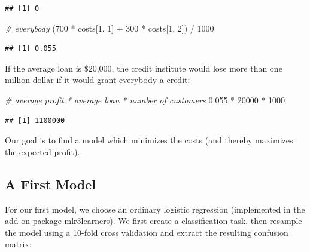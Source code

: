 \documentclass[
]{scrbook}
\newenvironment{Shaded}{\begin{snugshade}}{\end{snugshade}}
\newcommand{\CommentTok}[1]{\textcolor[rgb]{0.56,0.35,0.01}{\textit{#1}}}
\newcommand{\DecValTok}[1]{\textcolor[rgb]{0.00,0.00,0.81}{#1}}
\newcommand{\FloatTok}[1]{\textcolor[rgb]{0.00,0.00,0.81}{#1}}
\newcommand{\FunctionTok}[1]{\textcolor[rgb]{0.00,0.00,0.00}{#1}}
\newcommand{\NormalTok}[1]{#1}
\newcommand{\OtherTok}[1]{\textcolor[rgb]{0.56,0.35,0.01}{#1}}
\newcommand{\SpecialCharTok}[1]{\textcolor[rgb]{0.00,0.00,0.00}{#1}}
\newcommand{\StringTok}[1]{\textcolor[rgb]{0.31,0.60,0.02}{#1}}
\renewenvironment{Shaded} {\begin{snugshade}\small} {\end{snugshade}}
\begin{document}
\begin{verbatim}
## [1] 0
\end{verbatim}

\begin{Shaded}
\begin{Highlighting}[]
\CommentTok{\# everybody}
\NormalTok{(}\DecValTok{700} \SpecialCharTok{*}\NormalTok{ costs[}\DecValTok{1}\NormalTok{, }\DecValTok{1}\NormalTok{] }\SpecialCharTok{+} \DecValTok{300} \SpecialCharTok{*}\NormalTok{ costs[}\DecValTok{1}\NormalTok{, }\DecValTok{2}\NormalTok{]) }\SpecialCharTok{/} \DecValTok{1000}
\end{Highlighting}
\end{Shaded}

\begin{verbatim}
## [1] 0.055
\end{verbatim}

If the average loan is \$20,000, the credit institute would lose more than one million dollar if it would grant everybody a credit:

\begin{Shaded}
\begin{Highlighting}[]
\CommentTok{\# average profit * average loan * number of customers}
\FloatTok{0.055} \SpecialCharTok{*} \DecValTok{20000} \SpecialCharTok{*} \DecValTok{1000}
\end{Highlighting}
\end{Shaded}

\begin{verbatim}
## [1] 1100000
\end{verbatim}

Our goal is to find a model which minimizes the costs (and thereby maximizes the expected profit).

\hypertarget{a-first-model}{%
\subsection{A First Model}\label{a-first-model}}

For our first model, we choose an ordinary logistic regression (implemented in the add-on package \href{https://mlr3learners.mlr-org.com}{mlr3learners}).
We first create a classification task, then resample the model using a 10-fold cross validation and extract the resulting confusion matrix:

\begin{Shaded}
\end{Shaded}
\end{document}

